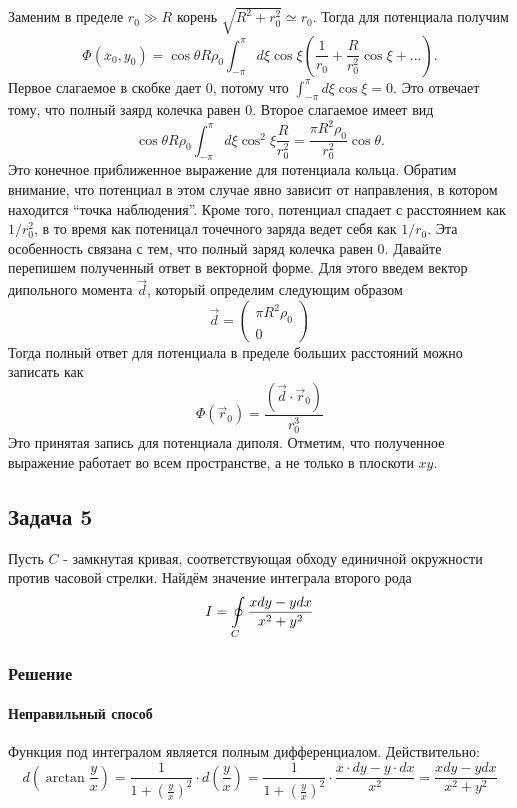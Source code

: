 \documentclass[a4paper,12pt]{article}
\begin{document}
Заменим в пределе $r_{0}\gg R$ корень $\sqrt{R^{2}+r_{0}^{2}}\simeq r_{0}$. Тогда для потенциала получим
$$
\Phi(x_{0},y_{0})	=\cos\theta R\rho_{0}\int_{-\pi}^{\pi}d\xi\cos\xi\left(\frac{1}{r_{0}}+\frac{R}{r_{0}^{2}}\cos\xi+...\right).
$$
Первое слагаемое в скобке дает 0, потому что $\int_{-\pi}^{\pi}d\xi\cos\xi=0$. Это  отвечает тому, что полный заярд колечка равен 0. Второе слагаемое имеет вид
$$
\cos\theta R\rho_{0}\int_{-\pi}^{\pi}d\xi\cos^{2}\xi\frac{R}{r_{0}^{2}}	=\frac{\pi R^{2}\rho_{0}}{r_{0}^{2}}\cos\theta.
$$
Это конечное приближенное выражение для потенциала кольца.
Обратим внимание, что потенциал в этом случае явно зависит от направления, в котором находится “точка наблюдения”. Кроме того, потенциал спадает с расстоянием как $1/r_{0}^{2}$, в то время как потеницал точечного заряда ведет себя как $1/r_{0}$. Эта особенность связана с тем, что полный заряд колечка равен $0$. Давайте перепишем полученный ответ в векторной форме. Для этого введем вектор дипольного момента $\vec{d}$, который определим следующим образом
$$\vec{d}	=\left(\begin{array}{c}
\pi R^{2}\rho_{0}\\
0
\end{array}\right)$$
Тогда полный ответ для потенциала в пределе больших расстояний можно записать как
$$\Phi(\vec{r}_{0})	=\frac{\left(\vec{d}\cdot\vec{r}_{0}\right)}{r_{0}^{3}}$$
Это принятая запись для потенциала диполя. Отметим, что полученное выражение работает во всем пространстве, а не только в плоскоти $xy$.

\subsection*{Задача 5}

Пусть $C$ - замкнутая кривая, соответствующая обходу единичной окружности
против часовой стрелки. Найдём значение интеграла второго рода
\[
I=\ointop_{C}\frac{xdy-ydx}{x^{2}+y^{2}}
\]



\subsubsection*{Решение}


\paragraph{Неправильный способ}

Функция под интегралом является полным дифференциалом. Действительно:
\[
d\left(\arctan\frac{y}{x}\right)=\frac{1}{1+\left(\frac{y}{x}\right)^{2}}\cdot d\left(\frac{y}{x}\right)=\frac{1}{1+\left(\frac{y}{x}\right)^{2}}\cdot\frac{x\cdot dy-y\cdot dx}{x^{2}}=\frac{xdy-ydx}{x^{2}+y^{2}}
\]
\end{document}
